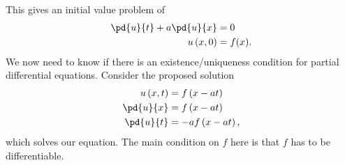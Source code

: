 \documentclass[10pt]{mypackage}
\begin{document}
This gives an initial value problem of
\begin{align*}
  \pd{u}{t} + a\pd{u}{x} &= 0\\
  u\left( x,0 \right) &= f(x).
\end{align*}
We now need to know if there is an existence/uniqueness condition for partial differential equations. Consider the proposed solution
\begin{align*}
  u\left( x,t \right) &= f\left( x-at \right)\\
  \pd{u}{x} &= f\left(x-at\right)\\
  \pd{u}{t} &= -af\left( x-at \right),
\end{align*}
which solves our equation. The main condition on $f$ here is that $f$ has to be differentiable.\newline
\end{document}

